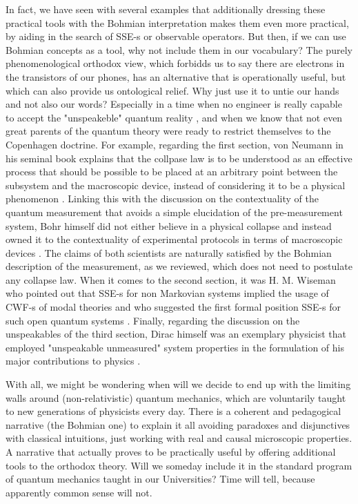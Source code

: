\documentclass[11pt, a4paper]{article} %
\begin{document}
In fact, we have seen with several examples that additionally dressing these practical tools with the Bohmian interpretation makes them even more practical, by aiding in the search of SSE-s or observable operators. But then, if we can use Bohmian concepts as a tool, why not include them in our vocabulary? The purely phenomenological orthodox view, which forbidds us to say there are electrons in the transistors of our phones, has an alternative that is operationally useful, but which can also provide us ontological relief. Why just use it to untie our hands and not also our words? Especially in a time when no engineer is really capable to accept the "unspeakeble" quantum reality \cite{where}, and when we know that not even great parents of the quantum theory were ready to restrict themselves to the Copenhagen doctrine. For example, regarding the first section, von Neumann in his seminal book \cite{vonNeumann} explains that the collpase law is to be understood as an effective process that should be possible to be placed at an arbitrary point between the subsystem and the macroscopic device, instead of considering it to be a physical phenomenon \cite{NeumannNoCollapse}. Linking this with the discussion on the contextuality of the quantum measurement that avoids a simple elucidation of the pre-measurement system, Bohr himself did not either believe in a physical collapse and instead owned it to the contextuality of experimental protocols \cite{Dirac} in terms of macroscopic devices \cite{Bohr}. The claims of both scientists are naturally satisfied by the Bohmian description of the measurement, as we reviewed, which does not need to postulate any collapse law. When it comes to the second section, it was H. M. Wiseman who pointed out that SSE-s for non Markovian systems implied the usage of CWF-s of modal theories \cite{interpretSSE, NMisModal} and who suggested the first formal position SSE-s for such open quantum systems \cite{WisemanSSE}. Finally, regarding the discussion on the unspeakables of the third section, Dirac himself was an exemplary physicist that employed "unspeakable unmeasured" system properties in the formulation of his major contributions to physics \cite{Dirac}.

With all, we might be wondering when will we decide to end up with the limiting walls around (non-relativistic) quantum mechanics, which are voluntarily taught to new generations of physicists every day. There is a coherent and pedagogical narrative (the Bohmian one) to explain it all avoiding paradoxes and disjunctives with classical intuitions, just working with real and causal microscopic properties. A narrative that actually proves to be practically useful by offering additional tools to the orthodox theory. Will we someday include it in the standard program of quantum mechanics taught in our Universities? Time will tell, because apparently common sense will not.
\end{document}
